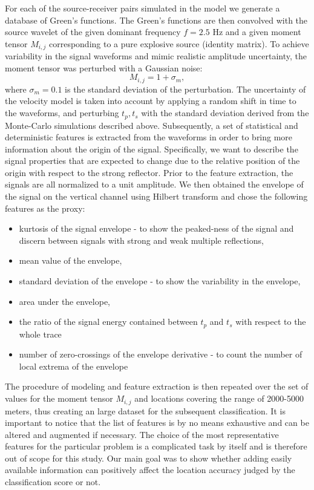 For each of the source-receiver pairs simulated in the model we generate a database of Green's functions. The Green's functions are then convolved with the source wavelet of the given dominant frequency $f=2.5$ Hz and a given moment tensor $M_{i,j}$ corresponding to a pure explosive source (identity matrix). To achieve variability in the signal waveforms and mimic realistic amplitude uncertainty, the moment tensor was perturbed with a Gaussian noise:
\begin{equation}
 M_{i,j} = 1 + \sigma_{m},
\end{equation}
where $\sigma_{m} = 0.1$ is the standard deviation of the perturbation. The uncertainty of the velocity model is taken into account by applying a random shift in time to the waveforms, and perturbing $t_{p},t_{s}$ with the standard deviation derived from the Monte-Carlo simulations described above. Subsequently, a set of statistical and deterministic features is extracted from the waveforms in order to bring more information about the origin of the signal. Specifically, we want to describe the signal properties that are expected to change due to the relative position of the origin with respect to the strong reflector. Prior to the feature extraction, the signals are all normalized to a unit amplitude. We then obtained the envelope of the signal on the vertical channel using Hilbert transform and chose the following features as the proxy:
\begin{itemize}
 \item kurtosis of the signal envelope - to show the peaked-ness of the signal and discern between signals with strong and weak multiple reflections,
 \item mean value of the envelope,
 \item standard deviation of the envelope - to show the variability in the envelope,
 \item area under the envelope,
 \item the ratio of the signal energy contained between $t_{p}$ and $t_{s}$ with respect to the whole trace
 \item number of zero-crossings of the envelope derivative - to count the number of local extrema of the envelope
\end{itemize}

The procedure of modeling and feature extraction is then repeated over the set of values for the moment tensor $M_{i,j}$ and locations covering the range of 2000-5000 meters, thus creating an large dataset for the subsequent classification. It is important to notice that the list of features is by no means exhaustive and can be altered and augmented if necessary. The choice of the most representative features for the particular problem is a complicated task by itself and is therefore out of scope for this study. Our main goal was to show whether adding easily available information can positively affect the location accuracy judged by the classification score or not.
